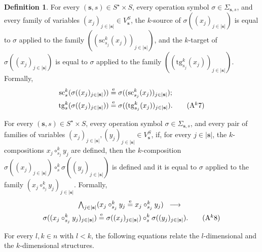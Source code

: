 \documentclass{amsart}
\theoremstyle{plain}
\theoremstyle{definition}
\newtheorem{definition}[theorem]{Definition}
\begin{document}
\begin{definition}
For every $(\mathbf{s},s)\in S^{\star}\times S$, every operation symbol $\sigma\in \Sigma_{\mathbf{s},s}$, and every family of variables $(x_{j})_{j\in \lvert\mathbf{s}\rvert}\in V^{S}_{\mathbf{s}}$, the $k$-source of $\sigma((x_{j})_{j\in \lvert\mathbf{s}\rvert})$ is equal to $\sigma$ applied to the family $((\mathrm{sc}^{k}_{s_{j}}(x_{j}))_{j\in \lvert\mathbf{s}\rvert})$, and the $k$-target of $\sigma((x_{j})_{j\in \lvert\mathbf{s}\rvert})$ is equal to $\sigma$ applied to the family $((\mathrm{tg}^{k}_{s_{j}}(x_{j}))_{j\in \lvert\mathbf{s}\rvert})$. Formally,
\allowdisplaybreaks
\begin{align*}
\mathrm{sc}^{k}_{s}(\sigma((x_{j})_{j\in \lvert\mathbf{s}\rvert}))&\overset{\mathrm{e}}{=}\sigma((\mathrm{sc}^{k}_{s_{j}}(x_{j}))_{j\in \lvert\mathbf{s}\rvert});\\
\mathrm{tg}^{k}_{s}(\sigma((x_{j})_{j\in \lvert\mathbf{s}\rvert}))&\overset{\mathrm{e}}{=}\sigma((\mathrm{tg}^{k}_{s_{j}}(x_{j}))_{j\in \lvert\mathbf{s}\rvert}).\label{DVarCompactAk7}\tag{A$^{k}$7}
\end{align*}

For every $(\mathbf{s},s)\in S^{\star}\times S$, every operation symbol $\sigma\in \Sigma_{\mathbf{s},s}$, and every pair of families of variables $(x_{j})_{j\in \lvert\mathbf{s}\rvert}, (y_{j})_{j\in \lvert\mathbf{s}\rvert}\in V^{S}_{\mathbf{s}}$, if, for every $j\in \lvert\mathbf{s}\rvert$, the $k$-compositions $x_{j}\circ^{k}_{s_{j}}y_{j}$ are defined, then the $k$-composition $\sigma((x_{j})_{j\in \lvert\mathbf{s}\rvert})\circ^{k}_{s}\sigma((y_{j})_{j\in \lvert\mathbf{s}\rvert})$ is defined and it is equal to $\sigma$ applied to the family $(x_{j}\circ^{k}_{s_{j}}y_{j})_{j\in \lvert\mathbf{s}\rvert}$. Formally,
\allowdisplaybreaks
\begin{multline*}
\textstyle
\bigwedge_{j\in \lvert\mathbf{s}\rvert}
(x_{j}\circ^{k}_{s_{j}} y_{j}\overset{\mathrm{e}}{=}x_{j}\circ^{k}_{s_{j}} y_{j})
\;\;\longrightarrow\;\;\\
\sigma((x_{j}\circ^{k}_{s_{j}}y_{j})_{j\in \lvert\mathbf{s}\rvert})
\overset{\mathrm{e}}{=}
\sigma((x_{j})_{j\in \lvert\mathbf{s}\rvert})\circ^{k}_{s}\sigma((y_{j})_{j\in \lvert\mathbf{s}\rvert}).
\label{DVarCompactAk8}\tag{A$^{k}$8}
\end{multline*}

For every $l,k\in n$ with $l<k$, the following equations relate the $l$-dimensional and the $k$-dimensional structures.


\end{definition}
\end{document}
